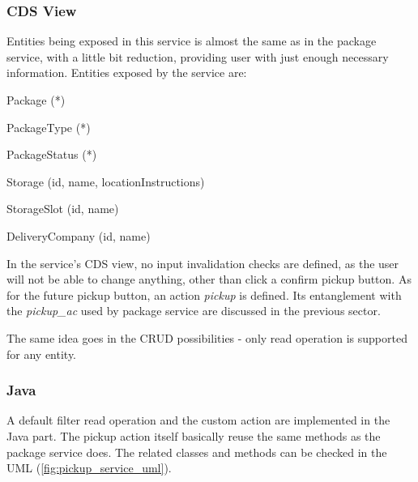 \subsubsection{CDS View}

Entities being exposed in this service is almost the same as in the package service, with a little bit reduction, providing user with just enough necessary information. Entities exposed by the service are:
\begin{compactenum}
	\item Package (*)
    \item PackageType (*)
    \item PackageStatus (*)
    \item Storage (id, name, locationInstructions)
    \item StorageSlot (id, name)
    \item DeliveryCompany (id, name)
\end{compactenum}

\bigskip
In the service's CDS view, no input invalidation checks are defined, as the user will not be able to change anything, other than click a confirm pickup button. As for the future pickup button, an action \textit{pickup} is defined. Its entanglement with the \textit{pickup\_ac} used by package service are discussed in the previous sector.

\bigskip
The same idea goes in the CRUD possibilities - only read operation is supported for any entity.

\subsubsection{Java}

A default filter read operation and the custom action are implemented in the Java part. The pickup action itself basically reuse the same methods as the package service does. The related classes and methods can be checked in the UML (\autoref{fig:pickup_service_uml}). 

